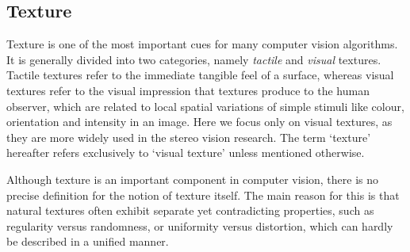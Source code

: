 \subsection{Texture}
Texture is one of the most important cues for many computer vision algorithms. It is generally divided into two categories, namely \textit{tactile} and \textit{visual} textures. Tactile textures refer to the immediate tangible feel of a surface, whereas visual textures refer to the visual impression that textures produce to the human observer, which are related to local spatial variations of simple stimuli like colour, orientation and intensity in an image. Here we focus only on visual textures, as they are more widely used in the stereo vision research. The term `texture' hereafter refers exclusively to `visual texture' unless mentioned otherwise.

Although texture is an important component in computer vision, there is no precise definition for the notion of texture itself. The main reason for this is that natural textures often exhibit separate yet contradicting properties, such as regularity versus randomness, or uniformity versus distortion, which can hardly be described in a unified manner. 


